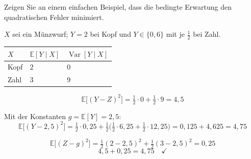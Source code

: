 \begin{aufgabe}
Zeigen Sie an einem einfachen Beispiel, dass die bedingte Erwartung den quadratischen Fehler minimiert.

\loesung
{}
$X$ sei ein Münzwurf; $Y = 2$ bei Kopf und $Y \in \{0, 6\}$ mit je $\tfrac12$ bei Zahl.

\begin{center}
{\small
\renewcommand{\arraystretch}{1.48}
\begin{tabular}{@{}P{2.0cm}P{2.4cm}P{2.6cm}@{}}
\toprule
$X$ & $\mathbb{E}[Y\mid X]$ & $\operatorname{Var}[Y\mid X]$\\
\midrule
Kopf & $2$ & $0$\\
Zahl & $3$ & $9$\\
\bottomrule
\end{tabular}}
\end{center}

\[ \mathbb{E}\bigl[(Y-Z)^{2}\bigr] = \tfrac12\cdot0 + \tfrac12\cdot9 = 4{,}5 \]

Mit der Konstanten $g = \mathbb{E}[Y] = 2{,}5$:
\[ \mathbb{E}\bigl[(Y-2{,}5)^{2}\bigr] = \tfrac12\cdot0{,}25 + \tfrac12\bigl(\tfrac12\cdot6{,}25+\tfrac12\cdot12{,}25\bigr) = 0{,}125 + 4{,}625 = 4{,}75 \]

\[ \mathbb{E}\bigl[(Z-g)^{2}\bigr] = \tfrac12(2-2{,}5)^{2} + \tfrac12(3-2{,}5)^{2} = 0{,}25 \]
\[ 4{,}5 + 0{,}25 = 4{,}75 \quad \checkmark \]

\begin{center}
\begin{minipage}{0.88\textwidth}
\end{minipage}
\end{center}
\end{aufgabe}

